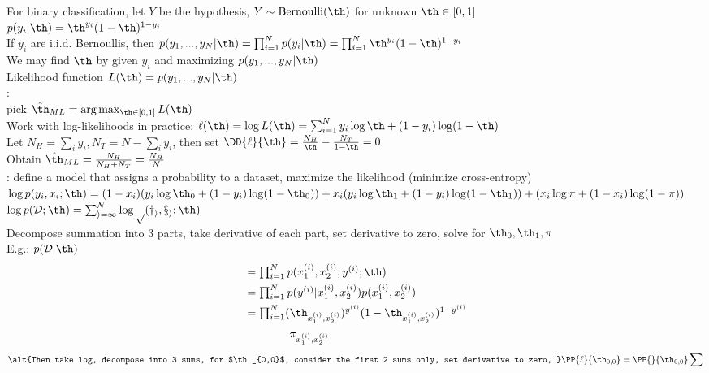 \documentclass[10pt]{CheatSheet/hw}
\begin{document}
\begin{multicols*}{5}
For binary classification, let $Y$ be the hypothesis, $Y\sim\operatorname{Bernoulli}(\th)$ for unknown $\th\in[0,1]$\\
$p(y_i|\th)=\th^{y_i}(1-\th)^{1-y_i}$\\
If $y_i$ are i.i.d. Bernoullis, then $p(y_1,...,y_N|\th)=\textstyle\prod_{i=1}^N p(y_i|\th)=\textstyle\prod_{i=1}^N \th^{y_i}(1-\th)^{1-y_i}$\\
We may find $\th$ by given $y_i$ and maximizing $p(y_1,...,y_N|\th)$ \\
Likelihood function $L(\th)=p(y_1,...,y_N|\th)$\\
: \\
pick $\hat{\th}_{ML}=\arg\max_{\th\in[0,1]} L(\th)$\\
Work with log-likelihoods in practice: $\ell(\th)=\log L(\th)=\sum_{i=1}^N y_i\log\th+(1-y_i)\log(1-\th)$\\
Let $N_H=\sum_i y_i, N_T=N-\sum_i y_i$, then set $\DD{\ell}{\th}=\frac{N_H}{\th}-\frac{N_T}{1-\th}=0$\\
Obtain $\hat{\th}_{ML}=\frac{N_H}{N_H+N_T}=\frac{N_H}{N}$\\
: define a model that assigns a probability to a dataset, maximize the likelihood (minimize cross-entropy)\\
$\log p(y_i,x_i;\th)=(1-x_i)(y_i\log \th_0+(1-y_i)\log(1-\th_0))+x_i(y_i\log \th_1+(1-y_i)\log(1-\th_1))+(x_i\log \pi + (1-x_i)\log(1-\pi))$\\
$\log p(\cal{D};\th)=\sum_{i=1}^N \log p(y_i,x_i;\th)$\\
Decompose summation into 3 parts, take derivative of each part, set derivative to zero, solve for $\th_0,\th_1,\pi$\\
E.g.: $p(\cal{D}|\th)$
\begin{align*}
    &=\textstyle\prod_{i=1}^N p(x_1^{(i)}, x_2^{(i)}, y^{(i)};\th)\\
    &=\textstyle\prod_{i=1}^N p(y^{(i)}|x_1^{(i)},x_2^{(i)})p(x_1^{(i)},x_2^{(i)})\\
    &=\textstyle\prod_{i=1}^N (\th_{x_1^{(i)},x_2^{(i)}})^{y^{(i)}}(1-\th_{x_1^{(i)},x_2^{(i)}})^{1-y^{(i)}}\\
    &\quad\quad\quad\quad\pi_{x_1^{(i)},x_2^{(i)}}
\end{align*}
\begin{align*}
\alt{Then take log, decompose into 3 sums, for $\th_{0,0}$, consider the first 2 sums only, set derivative to zero, }
\PP{\ell}{\th_{0,0}}&=\PP{}{\th_{0,0}}\sum\\

\end{align*}
\end{multicols*}
\end{document}
